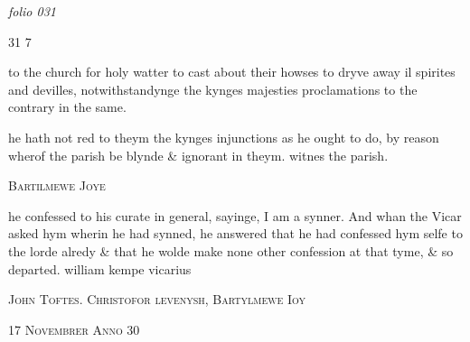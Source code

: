 \documentclass[12pt, a4paper]{book}
\begin{document}
\textit{folio 031}

	
	\begin{flushright}{\color{Mahogany}31} 7\end{flushright}

	
		\ifthenelse{\isodd{\thepage}}
		{\reversemarginpar}
		{\normalmarginpar}
		to the church for holy watter to cast about their howses
 to dryve away il spirites and devilles, notwithstandynge
 the kynges majesties proclamations to the contrary in the same.


				\marginpar[\vspace{0.5cm}{\textcolor{Gray}{Injunctions}}]{}
			
		\ifthenelse{\isodd{\thepage}}
		{\reversemarginpar}
		{\normalmarginpar}
		he hath not red to theym the kynges injunctions as he
 ought to do, by reason wherof the parish be blynde
 \& ignorant in theym. witnes the parish.
 

            
            	
				\begin{center} \begin{large} {\scshape Bartilmewe Joye} \end{large} \end{center}
			


				\marginpar[\vspace{0.5cm}{\textcolor{Gray}{confession}}]{}
			
		\ifthenelse{\isodd{\thepage}}
		{\reversemarginpar}
		{\normalmarginpar}
		he confessed to his curate in general, sayinge, I am a synner.
 And whan the Vicar asked hym wherin he had synned,
 he answered that he had confessed hym selfe to the lorde alredy
 \&  that he
			 wolde make none other confession at that tyme, \& so
	departed. william kempe vicarius
 

            
            	
				\begin{center} \begin{large} {\scshape John Toftes. Christofor levenysh,
               	Bartylmewe Ioy } \end{large} \end{center}
			
               
                  
				\begin{center}  {\scshape 
                     17 Novembrer Anno 30
                  }  \end{center}
			
\end{document}
